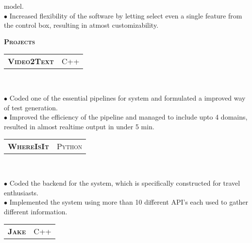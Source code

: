 \documentclass[10pt,a4paper,oneside]{article}
\begin{document}
\begin{minipage}[t]{0.63\textwidth}
\begin{adjustwidth}{7pt}{0pt}
{            model.\\
        $\bullet$ Increased flexibility of the software by letting select even a single feature from the control box, resulting in atmost
    customizability.}\\
        \end{adjustwidth}
        \textcolor{light-gray}{\textbf{\large P\textsc{rojects}}}
        \vspace{10pt}\\
        \begin{tabular}{c|c}
            \textbf{\normalsize V\textsc{ideo}2T\textsc{ext}}
            &\textmd{\normalsize C\textsc{++}}
        \end{tabular}\\
        \vspace{-4mm}
        \begin{adjustwidth}{7pt}{0pt}
            {\footnotesize $\bullet$ Coded one of the essential pipelines for system and formulated a improved way of test generation.\\
            $\bullet$ Improved the efficiency of the pipeline and managed to include upto 4 domains, resulted in almost realtime output in
        under 5 min. }\\ 
        \end{adjustwidth}
        \begin{tabular}{c|c}
            \textbf{\normalsize W\textsc{here}I\textsc{s}I\textsc{t}}
            &\textmd{\normalsize P\textsc{ython}}
        \end{tabular}\\
         \vspace{-4mm}
        \begin{adjustwidth}{7pt}{0pt}
            {\footnotesize $\bullet$ Coded the backend for the system, which is specifically constructed for travel enthusiasts.\\ 
            $\bullet$ Implemented the system using more than 10 different API's each used to gather different information.}\\ 
        \end{adjustwidth}
        \begin{tabular}{c|c}
            \textbf{\normalsize J\textsc{ake}}
            &\textmd{\normalsize C\textsc{++}}
        \end{tabular}\\
         \vspace{-4mm}
        \begin{adjustwidth}{7pt}{0pt}

\end{adjustwidth}
\end{minipage}
\end{document}
